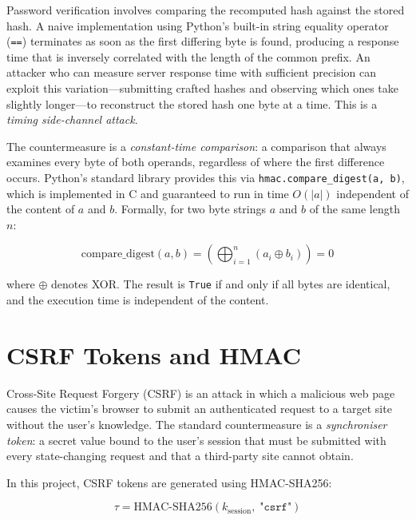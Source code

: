Password verification involves comparing the recomputed hash against the stored hash. A naive implementation using Python's built-in string equality operator (\texttt{==}) terminates as soon as the first differing byte is found, producing a response time that is inversely correlated with the length of the common prefix. An attacker who can measure server response time with sufficient precision can exploit this variation---submitting crafted hashes and observing which ones take slightly longer---to reconstruct the stored hash one byte at a time. This is a \emph{timing side-channel attack}.

The countermeasure is a \emph{constant-time comparison}: a comparison that always examines every byte of both operands, regardless of where the first difference occurs. Python's standard library provides this via \texttt{hmac.compare\_digest(a, b)}, which is implemented in C and guaranteed to run in time $O(|a|)$ independent of the content of $a$ and $b$. Formally, for two byte strings $a$ and $b$ of the same length $n$:

\begin{equation}
  \mathrm{compare\_digest}(a, b) = \left(\bigoplus_{i=1}^{n} (a_i \oplus b_i)\right) = 0
  \label{eq:constant_time}
\end{equation}

\noindent where $\oplus$ denotes XOR. The result is \texttt{True} if and only if all bytes are identical, and the execution time is independent of the content.

\section{CSRF Tokens and HMAC}
\label{sec:theory_csrf}

Cross-Site Request Forgery (CSRF) is an attack in which a malicious web page causes the victim's browser to submit an authenticated request to a target site without the user's knowledge. The standard countermeasure is a \emph{synchroniser token}: a secret value bound to the user's session that must be submitted with every state-changing request and that a third-party site cannot obtain.

In this project, CSRF tokens are generated using HMAC-SHA256:

\begin{equation}
  \tau = \mathrm{HMAC\text{-}SHA256}(k_{\text{session}},\; \texttt{"csrf"})
  \label{eq:csrf_token}
\end{equation}

